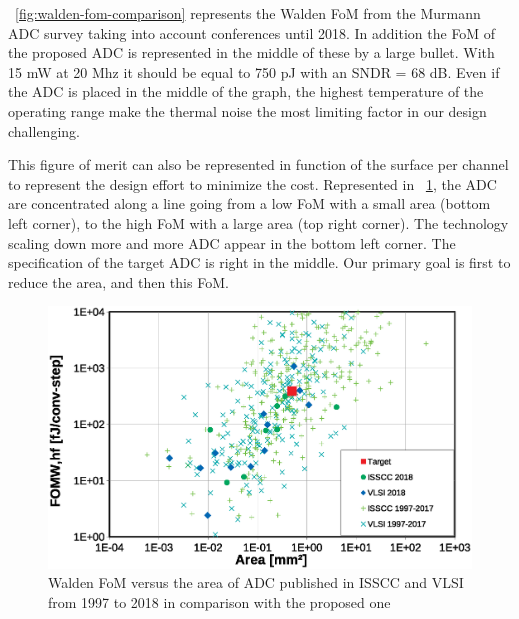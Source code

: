 \figurename~\ref{fig:walden-fom-comparison} represents the Walden FoM from the Murmann ADC survey taking into account conferences until 2018. In addition the FoM of the proposed ADC is represented in the middle of these by a large bullet. With 15 mW at 20 Mhz it should be equal to 750 pJ with an SNDR = 68 dB. Even if the ADC is placed in the middle of the graph, the highest temperature of the operating range make the thermal noise the most limiting factor in our design challenging.

This figure of merit can also be represented in function of the surface per channel to represent the design effort to minimize the cost. Represented in \figurename~\ref{fig:walden-area-fom-comparison}, the ADC are concentrated along a line going from a low FoM with a small area (bottom left corner), to the high FoM with a large area (top right corner). The technology scaling down more and more ADC appear in the bottom left corner. The specification of the target ADC is right in the middle. Our primary goal is first to reduce the area, and then this FoM.

\begin{figure}[htp]
    \centering
    \includegraphics[width=.8\textwidth]{Chapter2/Figs/Vector/walden-fom-area-2018.eps}
    \caption{Walden FoM versus the area of ADC published in ISSCC and VLSI from 1997 to 2018 in comparison with the proposed one}
    \label{fig:walden-area-fom-comparison}
\end{figure}

\clearpage
